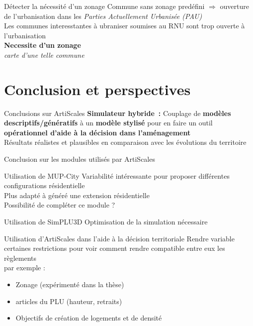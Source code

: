 \documentclass[xcolor=table]{beamer}
\begin{document}
\begin{frame}{Détecter la nécessité d'un zonage}
	Commune sans zonage predéfini $\Longrightarrow$ ouverture de l'urbanisation dans les \textit{Parties Actuellement Urbanisée (PAU)}
	\\
	Les communes interesstantes à ubraniser soumises au RNU sont trop ouverte à l'urbanisation 
	\\
	\textbf{Necessite d'un \textbf{zonage}}
	\\
	\textit{carte d'une telle commune}
\end{frame}




\section{Conclusion et perspectives}




\begin{frame}{Conclusions sur ArtiScales}
	\textbf{Simulateur hybride~:} Couplage de \textbf{modèles descriptifs/génératifs} à un \textbf{modèle stylisé} pour en faire un outil \textbf{opérationnel d'aide à la décision dans l'aménagement}
	\\
	Résultats réalistes et plausibles en comparaison avec les évolutions du territoire
\end{frame}

\begin{frame}{Conclusion sur les modules utilisés par ArtiScales}
	\begin{block}{Utilisation de MUP-City}
Variabilité intéressante pour proposer différentes configurations résidentielle
\\
		Plus adapté à généré une extension résidentielle
		\\
		Possibilité de compléter ce module ? 
	\end{block}
	\begin{block}{Utilisation de SimPLU3D}
		Optimisation de la simulation nécessaire
	\end{block}
\end{frame}

\begin{frame}{Utilisation d'ArtiScales dans l'aide à la décision territoriale}
Rendre variable certaines restrictions pour voir comment rendre compatible entre eux les règlements
\\
par exemple : 
\begin{itemize}
	\item Zonage (expérimenté dans la thèse)
	\item articles du PLU (hauteur, retraits)
	\item Objectifs de création de logements et de densité
\end{itemize}
\end{frame}
\end{document}
